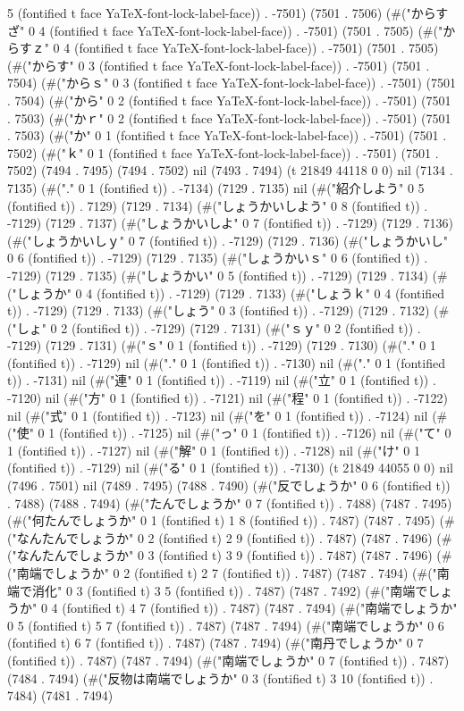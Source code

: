 5 (fontified t face YaTeX-font-lock-label-face)) . -7501) (7501 . 7506) (#("からすざ" 0 4 (fontified t face YaTeX-font-lock-label-face)) . -7501) (7501 . 7505) (#("からすｚ" 0 4 (fontified t face YaTeX-font-lock-label-face)) . -7501) (7501 . 7505) (#("からす" 0 3 (fontified t face YaTeX-font-lock-label-face)) . -7501) (7501 . 7504) (#("からｓ" 0 3 (fontified t face YaTeX-font-lock-label-face)) . -7501) (7501 . 7504) (#("から" 0 2 (fontified t face YaTeX-font-lock-label-face)) . -7501) (7501 . 7503) (#("かｒ" 0 2 (fontified t face YaTeX-font-lock-label-face)) . -7501) (7501 . 7503) (#("か" 0 1 (fontified t face YaTeX-font-lock-label-face)) . -7501) (7501 . 7502) (#("ｋ" 0 1 (fontified t face YaTeX-font-lock-label-face)) . -7501) (7501 . 7502) (7494 . 7495) (7494 . 7502) nil (7493 . 7494) (t 21849 44118 0 0) nil (7134 . 7135) (#("." 0 1 (fontified t)) . -7134) (7129 . 7135) nil (#("紹介しよう" 0 5 (fontified t)) . 7129) (7129 . 7134) (#("しょうかいしよう" 0 8 (fontified t)) . -7129) (7129 . 7137) (#("しょうかいしよ" 0 7 (fontified t)) . -7129) (7129 . 7136) (#("しょうかいしｙ" 0 7 (fontified t)) . -7129) (7129 . 7136) (#("しょうかいし" 0 6 (fontified t)) . -7129) (7129 . 7135) (#("しょうかいｓ" 0 6 (fontified t)) . -7129) (7129 . 7135) (#("しょうかい" 0 5 (fontified t)) . -7129) (7129 . 7134) (#("しょうか" 0 4 (fontified t)) . -7129) (7129 . 7133) (#("しょうｋ" 0 4 (fontified t)) . -7129) (7129 . 7133) (#("しょう" 0 3 (fontified t)) . -7129) (7129 . 7132) (#("しょ" 0 2 (fontified t)) . -7129) (7129 . 7131) (#("ｓｙ" 0 2 (fontified t)) . -7129) (7129 . 7131) (#("ｓ" 0 1 (fontified t)) . -7129) (7129 . 7130) (#("." 0 1 (fontified t)) . -7129) nil (#("." 0 1 (fontified t)) . -7130) nil (#("." 0 1 (fontified t)) . -7131) nil (#("連" 0 1 (fontified t)) . -7119) nil (#("立" 0 1 (fontified t)) . -7120) nil (#("方" 0 1 (fontified t)) . -7121) nil (#("程" 0 1 (fontified t)) . -7122) nil (#("式" 0 1 (fontified t)) . -7123) nil (#("を" 0 1 (fontified t)) . -7124) nil (#("使" 0 1 (fontified t)) . -7125) nil (#("っ" 0 1 (fontified t)) . -7126) nil (#("て" 0 1 (fontified t)) . -7127) nil (#("解" 0 1 (fontified t)) . -7128) nil (#("け" 0 1 (fontified t)) . -7129) nil (#("る" 0 1 (fontified t)) . -7130) (t 21849 44055 0 0) nil (7496 . 7501) nil (7489 . 7495) (7488 . 7490) (#("反でしょうか" 0 6 (fontified t)) . 7488) (7488 . 7494) (#("たんでしょうか" 0 7 (fontified t)) . 7488) (7487 . 7495) (#("何たんでしょうか" 0 1 (fontified t) 1 8 (fontified t)) . 7487) (7487 . 7495) (#("なんたんでしょうか" 0 2 (fontified t) 2 9 (fontified t)) . 7487) (7487 . 7496) (#("なんたんでしょうか" 0 3 (fontified t) 3 9 (fontified t)) . 7487) (7487 . 7496) (#("南端でしょうか" 0 2 (fontified t) 2 7 (fontified t)) . 7487) (7487 . 7494) (#("南端で消化" 0 3 (fontified t) 3 5 (fontified t)) . 7487) (7487 . 7492) (#("南端でしょうか" 0 4 (fontified t) 4 7 (fontified t)) . 7487) (7487 . 7494) (#("南端でしょうか" 0 5 (fontified t) 5 7 (fontified t)) . 7487) (7487 . 7494) (#("南端でしょうか" 0 6 (fontified t) 6 7 (fontified t)) . 7487) (7487 . 7494) (#("南丹でしょうか" 0 7 (fontified t)) . 7487) (7487 . 7494) (#("南端でしょうか" 0 7 (fontified t)) . 7487) (7484 . 7494) (#("反物は南端でしょうか" 0 3 (fontified t) 3 10 (fontified t)) . 7484) (7481 . 7494) 